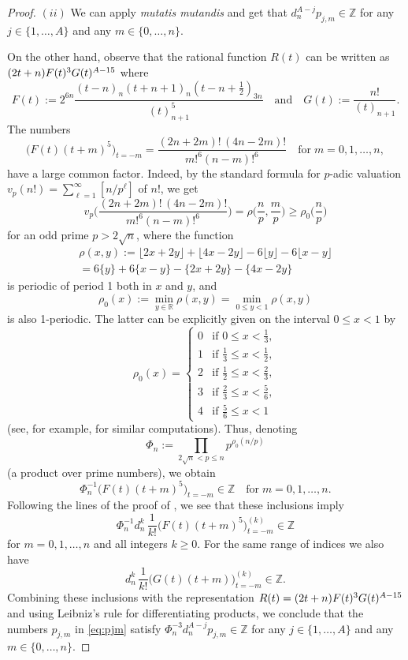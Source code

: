 \documentclass[reqno,12pt]{article}
\theoremstyle{remark}
\begin{document}
\begin{proof}
$(ii)$ We can apply {\em mutatis mutandis}  \cite[Lemma 1]{zud2} and get that $d_n^{A-j}p_{j,m}\in \mathbb Z$ for any $j\in\{1,\ldots,A\}$ and any $m \in\{0, \ldots, n\}$. 

On the other hand, observe that the rational function $R(t)$ can be written as $(2t+\nobreak n)\*F(t)^3G(t)^{A-15}$
where
$$
F(t):=2^{6n}\frac{(t-n)_n(t+n+1)_{n}(t-n+\frac12)_{3n}}{(t)_{n+1}^5}
\quad\text{and}\quad
G(t):=\frac{n!}{(t)_{n+1}}.
$$
The numbers
$$
\big(F(t)(t+m)^5\big)_{t=-m}=\frac{(2n+2m)!\,(4n-2m)!}{m!^6(n-m)!^6}
\quad\text{for}\; m=0,1,\dots,n,
$$
have a large common factor. Indeed, by the standard formula for $p$-adic valuation $v_p(n!)=\sum_{\ell=1}^\infty [n/p^\ell]$ of $n!$, we get
$$
v_p\Big(\frac{(2n+2m)!\,(4n-2m)!}{m!^6(n-m)!^6}\Big)
=\rho\Big(\frac np,\frac mp\Bigr)
\ge\rho_0\Big(\frac np\Bigr)
$$
for an odd prime $p>2\sqrt{n}$, where the function
\begin{multline*}
\rho(x,y):=\lfloor2x+2y\rfloor+\lfloor4x-2y\rfloor-6\lfloor y\rfloor-6\lfloor x-y\rfloor
\\
=6\{y\}+6\{x-y\}-\{2x+2y\}-\{4x-2y\}
\end{multline*}
is periodic of period 1 both in $x$ and $y$, and 
$$
\rho_0(x):=\min_{y\in\mathbb R}\rho(x,y)=\min_{0\le y<1}\rho(x,y)
$$
is also 1-periodic. The latter can be explicitly given on the interval $0\le x<1$ by
$$
\rho_0(x)=\begin{cases}
0 & \text{if $0\le x<\frac13$}, \\
1 & \text{if $\frac13\le x<\frac12$}, \\
2 & \text{if $\frac12\le x<\frac23$}, \\
3 & \text{if $\frac23\le x<\frac56$}, \\
4 & \text{if $\frac56\le x<1$}
\end{cases}
$$
(see, for example, \cite[\S\,4]{zud3} for similar  computations). Thus, denoting
\begin{equation}
\Phi_n:=\prod_{2\sqrt n<p\le n}p^{\rho_0(n/p)}
\label{Phi_n}
\end{equation}
(a product over prime numbers), we obtain
$$
\Phi_n^{-1}\big(F(t)(t+m)^5\big)_{t=-m}\in\mathbb Z
\quad\text{for}\; m=0,1,\dots,n.
$$
Following the lines of the proof of  \cite[Lemma 4.2]{zud3}, we see that these inclusions imply
$$
\Phi_n^{-1}d_n^k\,\frac1{k!}\big(F(t)(t+m)^5\big)^{(k)}_{t=-m}\in\mathbb Z
$$
for $m=0,1,\dots,n$ and all integers $k\ge 0$. For the same range of indices we also have
$$
d_n^k\,\frac1{k!}\big(G(t)(t+m)\big)^{(k)}_{t=-m}\in\mathbb Z.
$$
Combining these inclusions with the representation $R(t)=(2t+\nobreak n)\*F(t)^3G(t)^{A-15}$ and using  Leibniz's rule
for differentiating products, we conclude that the numbers $p_{j,m}$ in \eqref{eq:pjm} satisfy
$\Phi_n^{-3}d_n^{A-j}p_{j,m}\in\mathbb Z$ for any $j\in\{1,\ldots,A\}$ and any $m \in\{0, \ldots, n\}$.


\end{proof}
\end{document}

